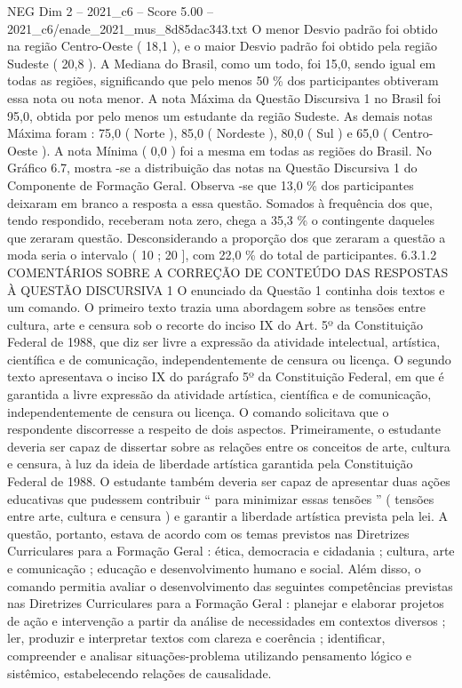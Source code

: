 \begin{textsample}{NEG Dim 2 – 2021\_c6 – Score 5.00 – 2021\_c6/enade\_2021\_mus\_8d85dac343.txt}
O menor Desvio padrão foi obtido na região Centro-Oeste ( 18,1 ), e o maior Desvio padrão foi obtido pela região Sudeste ( 20,8 ).
A Mediana do Brasil, como um todo, foi 15,0, sendo igual em todas as regiões, significando que pelo menos 50 \% dos participantes obtiveram essa nota ou nota menor.
A nota Máxima da Questão Discursiva 1 no Brasil foi 95,0, obtida por pelo menos um estudante da região Sudeste.
As demais notas Máxima foram : 75,0 ( Norte ), 85,0 ( Nordeste ), 80,0 ( Sul ) e 65,0 ( Centro-Oeste ).
A nota Mínima ( 0,0 ) foi a mesma em todas as regiões do Brasil.
No Gráfico 6.7, mostra -se a distribuição das notas na Questão Discursiva 1 do Componente de Formação Geral.
Observa -se que 13,0 \% dos participantes deixaram em branco a resposta a essa questão.
Somados à frequência dos que, tendo respondido, receberam nota zero, chega a 35,3 \% o contingente daqueles que zeraram questão.
Desconsiderando a proporção dos que zeraram a questão a moda seria o intervalo ( 10 ; 20 ], com 22,0 \% do total de participantes. 6.3.1.2 COMENTÁRIOS SOBRE A CORREÇÃO DE CONTEÚDO DAS RESPOSTAS À QUESTÃO DISCURSIVA 1 O enunciado da Questão 1 continha dois textos e um comando.
O primeiro texto trazia uma abordagem sobre as tensões entre cultura, arte e censura sob o recorte do inciso IX do Art. 5º da Constituição Federal de 1988, que diz ser livre a expressão da atividade intelectual, artística, científica e de comunicação, independentemente de censura ou licença.
O segundo texto apresentava o inciso IX do parágrafo 5º da Constituição Federal, em que é garantida a livre expressão da atividade artística, científica e de comunicação, independentemente de censura ou licença.
O comando solicitava que o respondente discorresse a respeito de dois aspectos.
Primeiramente, o estudante deveria ser capaz de dissertar sobre as relações entre os conceitos de arte, cultura e censura, à luz da ideia de liberdade artística garantida pela Constituição Federal de 1988.
O estudante também deveria ser capaz de apresentar duas ações educativas que pudessem contribuir “ para minimizar essas tensões ” ( tensões entre arte, cultura e censura ) e garantir a liberdade artística prevista pela lei.
A questão, portanto, estava de acordo com os temas previstos nas Diretrizes Curriculares para a Formação Geral : ética, democracia e cidadania ; cultura, arte e comunicação ; educação e desenvolvimento humano e social.
Além disso, o comando permitia avaliar o desenvolvimento das seguintes competências previstas nas Diretrizes Curriculares para a Formação Geral : planejar e elaborar projetos de ação e intervenção a partir da análise de necessidades em contextos diversos ; ler, produzir e interpretar textos com clareza e coerência ; identificar, compreender e analisar situações-problema utilizando pensamento lógico e sistêmico, estabelecendo relações de causalidade.

\end{textsample}
